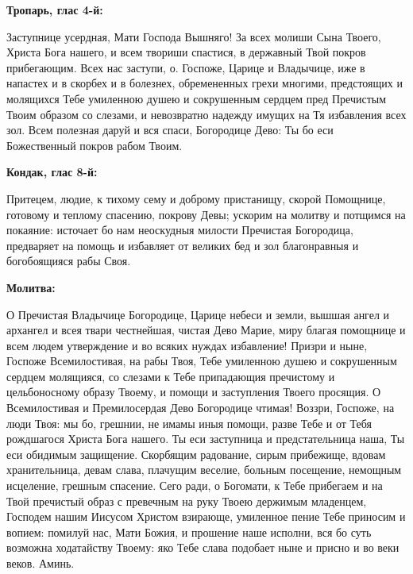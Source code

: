 \bigskip\bigskip\mychapterending

 

\bfseries Тропарь, глас 4-й:\normalfont{}\nopagebreak


Заступнице усердная, Мати Господа Вышняго! За всех молиши Сына Твоего, Христа Бога нашего, и всем твориши спастися, в державный Твой покров прибегающим. Всех нас заступи, о. Госпоже, Царице и Владычице, иже в напастех и в скорбех и в болезнех, обремененных грехи многими, предстоящих и молящихся Тебе умиленною душею и сокрушенным сердцем пред Пречистым Твоим образом со слезами, и невозвратно надежду имущих на Тя избавления всех зол. Всем полезная даруй и вся спаси, Богородице Дево: Ты бо еси Божественный покров рабом Твоим.


\medskip


\bfseries Кондак, глас 8-й\normalfont{}:


Притецем, людие, к тихому сему и доброму пристанищу, скорой Помощнице, готовому и теплому спасению, покрову Девы; ускорим на молитву и потщимся на покаяние: источает бо нам неоскудныя милости Пречистая Богородица, предваряет на помощь и избавляет от великих бед и зол благонравныя и богобоящияся рабы Своя.


\medskip


\bfseries Молитва:\normalfont{}\nopagebreak


О Пречистая Владычице Богородице, Царице небеси и земли, вышшая ангел и архангел и всея твари честнейшая, чистая Дево Марие, миру благая помощнице и всем людем утверждение и во всяких нуждах избавление! Призри и ныне, Госпоже Всемилостивая, на рабы Твоя, Тебе умиленною душею и сокрушенным сердцем молящияся, со слезами к Тебе припадающия пречистому и цельбоносному образу Твоему, и помощи и заступления Твоего просящия. О Всемилостивая и Премилосердая Дево Богородице чтимая! Воззри, Госпоже, на люди Твоя: мы бо, грешнии, не имамы иныя помощи, разве Тебе и от Тебя рождшагося Христа Бога нашего. Ты еси заступница и предстательница наша, Ты еси обидимым защищение. Скорбящим радование, сирым прибежище, вдовам хранительница, девам слава, плачущим веселие, больным посещение, немощным исцеление, грешным спасение. Сего ради, о Богомати, к Тебе прибегаем и на Твой пречистый образ с превечным на руку Твоею держимым младенцем, Господем нашим Иисусом Христом взирающе, умиленное пение Тебе приносим и вопием: помилуй нас, Мати Божия, и прошение наше исполни, вся бо суть возможна ходатайству Твоему: яко Тебе слава подобает ныне и присно и во веки веков. Аминь.


